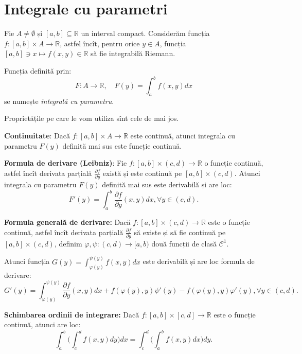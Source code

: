 \documentclass[11pt,a4paper]{article}
\newcommand\kal{\mathcal}
\newcommand\seq{\subseteq}
\newcommand\vid{\emptyset}
\newcommand\RR{\mathbb{R}}
\theoremstyle{dotless}
\theoremstyle{dotlessdr}
\begin{document}



\section{Integrale cu parametri}
\label{sec:int-param}

Fie $A \neq \vid$ și $[a, b] \seq \RR$ un interval compact. Considerăm funcția
$f : [a, b] \times A \to \RR$, astfel încît, pentru orice $y \in A$, funcția
$[a, b] \ni x \mapsto f(x, y) \in \RR$ să fie integrabilă Riemann.

Funcția definită prin:
\[
  F : A \to \RR, \quad F(y) = \int_a^b f(x, y) dx
\]
se numește \emph{integrală cu parametru}.

Proprietățile pe care le vom utiliza sînt cele de mai jos.

\textbf{Continuitate}: Dacă $f : [a, b] \times A \to \RR$ este continuă, atunci
integrala cu parametru $F(y)$ definită mai sus este funcție continuă.

\vspace{1cm}

\textbf{Formula de derivare (Leibniz)}: Fie $f : [a, b] \times (c, d) \to \RR$
o funcție continuă, astfel încît derivata parțială $\frac{\partial f}{\partial y}$
există și este continuă pe $[a, b] \times (c, d)$. Atunci integrala cu parametru
$F(y)$ definită mai sus este derivabilă și are loc:
\[
  F'(y) = \int_a^b \frac{\partial f}{\partial y}(x, y) dx, \forall y \in (c, d).
\]

\vspace{1cm}

\textbf{Formula generală de derivare:} Dacă $f : [a, b] \times (c, d) \to \RR$
este o funcție continuă, astfel încît derivata parțială $\frac{\partial f}{\partial y}$
să existe și să fie continuă pe $[a, b] \times (c, d)$, definim
$\varphi, \psi : (c, d) \to [a, b)$ două funcții de clasă $\kal{C}^1$.

Atunci funcția $G(y) = \int_{\varphi(y)}^{\psi(y)} f(x, y) dx$ este derivabilă
și are loc formula de derivare:
\[
  G'(y) = \int_{\varphi(y)}^{\psi(y)} \frac{\partial f}{\partial y}(x, y) dx + %
  f(\varphi(y), y) \psi'(y) - f(\varphi(y), y) \varphi'(y), \forall y \in (c, d).
\]

\vspace{1cm}

\textbf{Schimbarea ordinii de integrare:} Dacă $f: [a, b] \times [c, d] \to \RR$
este o funcție continuă, atunci are loc:
\[
  \int_a^b \Big( \int_c^d f(x, y) dy \Big) dx = %
  \int_c^d \Big( \int_a^b f(x, y) dx \Big) dy.
\]
\end{document}
